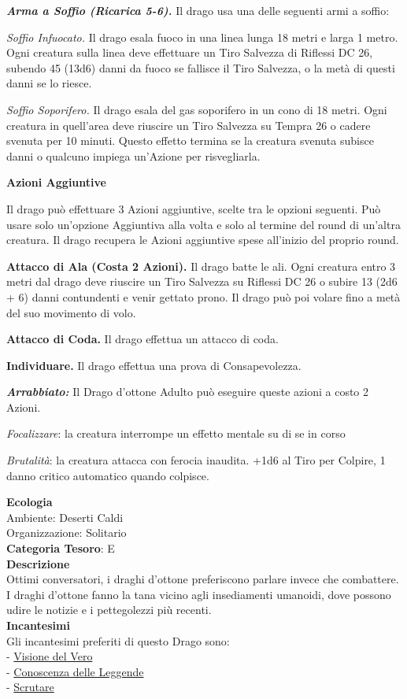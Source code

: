 \begin{multicols}{2}
{\emph{\textbf{Arma a Soffio (Ricarica 5-6).}} Il drago usa una delle seguenti armi a soffio:

\emph{Soffio Infuocato.} Il drago esala fuoco in una linea lunga 18 metri e larga 1 metro. Ogni creatura sulla linea deve effettuare un Tiro Salvezza di Riflessi DC 26, subendo 45 (13d6) danni da fuoco se fallisce il Tiro Salvezza, o la metà di questi danni se lo riesce.

\emph{Soffio Soporifero.} Il drago esala del gas soporifero in un cono di 18 metri. Ogni creatura in quell'area deve riuscire un Tiro Salvezza su Tempra 26 o cadere svenuta per 10 minuti. Questo effetto termina se la creatura svenuta subisce danni o qualcuno impiega un'Azione per risvegliarla.

\textbf{Azioni Aggiuntive}

Il drago può effettuare 3 Azioni aggiuntive, scelte tra le opzioni seguenti. Può usare solo un'opzione Aggiuntiva alla volta e solo al termine del round di un'altra creatura. Il drago recupera le Azioni aggiuntive spese all'inizio del proprio round.

\textbf{Attacco di Ala (Costa 2 Azioni).} Il drago batte le ali. Ogni creatura entro 3 metri dal drago deve riuscire un Tiro Salvezza su Riflessi DC 26 o subire 13 (2d6 + 6) danni contundenti e venir gettato prono. Il drago può poi volare fino a metà del suo movimento di volo.

\textbf{Attacco di Coda.} Il drago effettua un attacco di coda.

\textbf{Individuare.} Il drago effettua una prova di Consapevolezza.

\emph{\textbf{Arrabbiato:}} Il Drago d'ottone Adulto può eseguire queste azioni a costo 2 Azioni.

\emph{Focalizzare}: la creatura interrompe un effetto mentale su di se in corso

\emph{Brutalità}: la creatura attacca con ferocia inaudita. +1d6 al Tiro per Colpire, 1 danno critico automatico quando colpisce.

\textbf{Ecologia}\\
Ambiente: Deserti Caldi\\
Organizzazione: Solitario\\
\textbf{Categoria Tesoro}: E\\
\textbf{Descrizione}\\
Ottimi conversatori, i draghi d'ottone preferiscono parlare invece che combattere. I draghi d'ottone fanno la tana vicino agli insediamenti umanoidi, dove possono udire le notizie e i pettegolezzi più recenti.\\
\textbf{Incantesimi}\\
Gli incantesimi preferiti di questo Drago sono:\\
- \hyperlink{Visione del Vero}{Visione del Vero}\\
- \hyperlink{Conoscenza delle Leggende}{Conoscenza delle Leggende}\\
- \hyperlink{Scrutare}{Scrutare}

}
\end{multicols}
